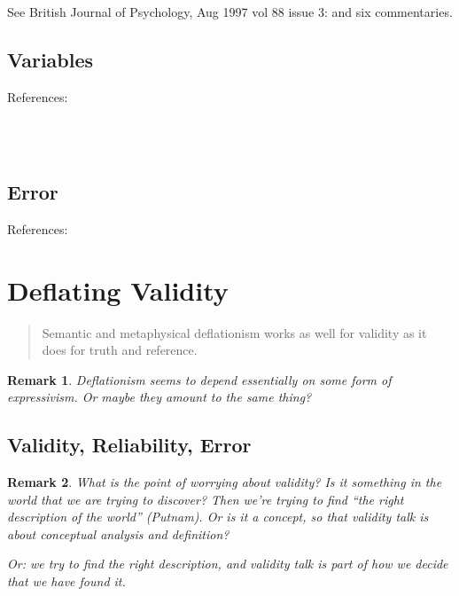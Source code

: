 \documentclass[11pt,twoside]{article}
\newtheorem{remark}{Remark}
\begin{document}
See British Journal of Psychology, Aug 1997 vol 88 issue 3:
\cite{michell_quantitative_1997} and six commentaries.

\subsection{Variables}

References:

\noindent
\cite{schwarz_is_2009}\\
\cite{toomela_variables_2008}\\
\cite{stam_fault_2010}

\subsection{Error}

References:

\noindent
\cite{smith_refining_2011}

\section{Deflating Validity}

\begin{abstract}
Semantic and metaphysical deflationism works as well for validity as
it does for truth and reference.
\end{abstract}

\begin{remark}
  Deflationism seems to depend essentially on some form of
  expressivism.  Or maybe they amount to the same thing?
\end{remark}

\subsection{Validity, Reliability, Error}
\label{sub:Validity}

\begin{remark}
What is the point of worrying about validity?  Is it something in the
world that we are trying to discover?  Then we're trying to find ``the
right description of the world'' (Putnam).  Or is it a concept, so
that validity talk is about conceptual analysis and definition?

Or: we try to find the right description, and validity talk is part of
how we decide that we have found it.

\end{remark}
\end{document}
